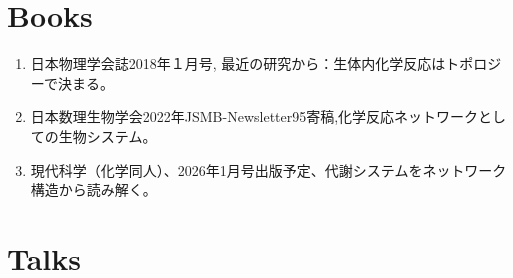 \documentclass[letterpaper,12pt]{article}
\begin{document}
\section*{Books}
\begin{enumerate}
\item  日本物理学会誌2018年１月号, 最近の研究から：生体内化学反応はトポロジーで決まる。
\item 日本数理生物学会2022年JSMB-Newsletter95寄稿,化学反応ネットワークとしての生物システム。
\item 現代科学（化学同人）、2026年1月号出版予定、代謝システムをネットワーク構造から読み解く。

\end{enumerate}

\section*{{\bf Talks  }}
\end{document}
